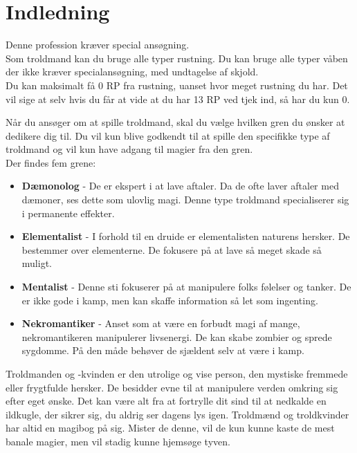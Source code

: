 \chapter{Indledning}

Denne profession kræver special ansøgning.\\
Som troldmand kan du bruge alle typer rustning. Du kan bruge alle typer våben der ikke kræver specialansøgning, med undtagelse af skjold.\\
Du kan maksimalt få 0 RP fra rustning, uanset hvor meget rustning du har. Det vil sige at selv hvis du får at vide at du har 13 RP ved tjek ind, så har du kun 0.

Når du ansøger om at spille troldmand, skal du vælge hvilken gren du ønsker at dedikere dig til. Du vil kun blive godkendt til at spille den specifikke type af troldmand og vil kun have adgang til magier fra den gren.\\
Der findes fem grene:\\
\begin{itemize}
    \item \textbf{Dæmonolog} - De er ekspert i at lave aftaler. Da de ofte laver aftaler med dæmoner, ses dette som ulovlig magi. Denne type troldmand specialiserer sig i permanente effekter.
    \item \textbf{Elementalist} - I forhold til en druide er elementalisten naturens hersker. De bestemmer over elementerne. De fokusere på at lave så meget skade så muligt.
    \item \textbf{Mentalist} - Denne sti fokuserer på at manipulere folks følelser og tanker. De er ikke gode i kamp, men kan skaffe information så let som ingenting.
    \item \textbf{Nekromantiker} - Anset som at være en forbudt magi af mange, nekromantikeren manipulerer livsenergi. De kan skabe zombier og sprede sygdomme. På den måde behøver de sjældent selv at være i kamp.
\end{itemize}

Troldmanden og -kvinden er den utrolige og vise person, den mystiske fremmede eller frygtfulde
hersker. De besidder evne til at manipulere verden omkring sig efter eget ønske. Det kan være alt fra
at fortrylle dit sind til at nedkalde en ildkugle, der sikrer sig, du aldrig ser dagens lys igen. Troldmænd
og troldkvinder har altid en magibog på sig. Mister de denne, vil de kun kunne kaste de mest banale
magier, men vil stadig kunne hjemsøge tyven.

